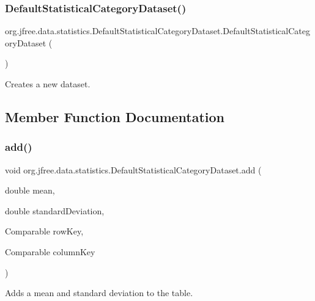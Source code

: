 \subsubsection{\texorpdfstring{Default\+Statistical\+Category\+Dataset()}{DefaultStatisticalCategoryDataset()}}
{\footnotesize\ttfamily org.\+jfree.\+data.\+statistics.\+Default\+Statistical\+Category\+Dataset.\+Default\+Statistical\+Category\+Dataset (\begin{DoxyParamCaption}{ }\end{DoxyParamCaption})}

Creates a new dataset. 

\subsection{Member Function Documentation}
\mbox{\label{classorg_1_1jfree_1_1data_1_1statistics_1_1_default_statistical_category_dataset_a85a6a03116003a566a7b85bb2f6ec644}} 
\subsubsection{\texorpdfstring{add()}{add()}\hspace{0.1cm}{\footnotesize\ttfamily [1/2]}}
{\footnotesize\ttfamily void org.\+jfree.\+data.\+statistics.\+Default\+Statistical\+Category\+Dataset.\+add (\begin{DoxyParamCaption}\item[{double}]{mean,  }\item[{double}]{standard\+Deviation,  }\item[{Comparable}]{row\+Key,  }\item[{Comparable}]{column\+Key }\end{DoxyParamCaption})}

Adds a mean and standard deviation to the table.


